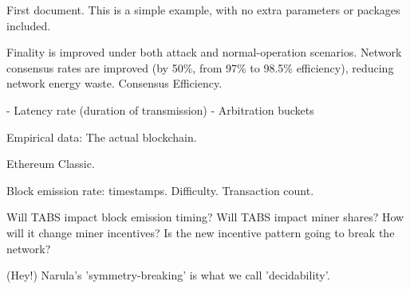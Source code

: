 \documentclass{article}
\begin{document}
First document. This is a simple example, with no 
extra parameters or packages included.


Finality is improved under both attack and normal-operation scenarios.
Network consensus rates are improved (by 50\%, from 97\% to 98.5\% efficiency), reducing network energy waste. Consensus Efficiency.

- Latency rate (duration of transmission)
- Arbitration buckets




	Empirical data:
	The actual blockchain.

	Ethereum Classic.

	Block emission rate: timestamps.
	Difficulty.
	Transaction count.

	Will TABS impact block emission timing?
	Will TABS impact miner shares?
	How will it change miner incentives?
	Is the new incentive pattern going to break the network?

	(Hey!) Narula's 'symmetry-breaking' is what we call 'decidability'.
\end{document}
